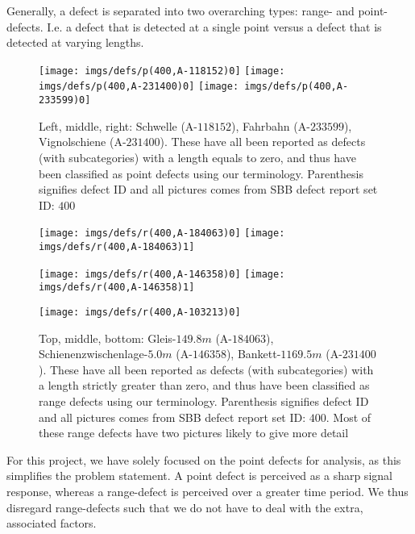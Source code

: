 Generally, a defect is separated into two overarching types: range- and point-defects. I.e. a defect that is detected at a single point versus a defect that is detected at varying lengths.
\begin{figure}[H]
	\centering
	\texttt{[image: imgs/defs/p(400,A-118152)0]}
	\texttt{[image: imgs/defs/p(400,A-231400)0]}
	\texttt{[image: imgs/defs/p(400,A-233599)0]}
	\caption{Left, middle, right: Schwelle (A-$118152$), Fahrbahn (A-$233599$), Vignolschiene (A-$231400$). These have all been reported as defects (with subcategories) with a length equals to zero, and thus have been classified as point defects using our terminology. Parenthesis signifies defect ID and all pictures comes from SBB defect report set ID: $400$}
\end{figure}
\begin{figure}[H]
	\centering
	\texttt{[image: imgs/defs/r(400,A-184063)0]}
	\texttt{[image: imgs/defs/r(400,A-184063)1]}
	
	\texttt{[image: imgs/defs/r(400,A-146358)0]}
	\texttt{[image: imgs/defs/r(400,A-146358)1]}
\end{figure}
\begin{figure}[H]
	\centering
	\texttt{[image: imgs/defs/r(400,A-103213)0]}
	\caption{Top, middle, bottom: Gleis-$149.8 m$ (A-$184063$), Schienenzwischenlage-$5.0 m$ (A-$146358$), Bankett-$1169.5 m$ (A-$231400$). These have all been reported as defects (with subcategories) with a length strictly greater than zero, and thus have been classified as range defects using our terminology. Parenthesis signifies defect ID and all pictures comes from SBB defect report set ID: $400$. Most of these range defects have two pictures likely to give more detail}
\end{figure}
\raggedbottom %
For this project, we have solely focused on the point defects for analysis, as this simplifies the problem statement. A point defect is perceived as a sharp signal response, whereas a range-defect is perceived over a greater time period. We thus disregard range-defects such that we do not have to deal with the extra, associated factors. 



